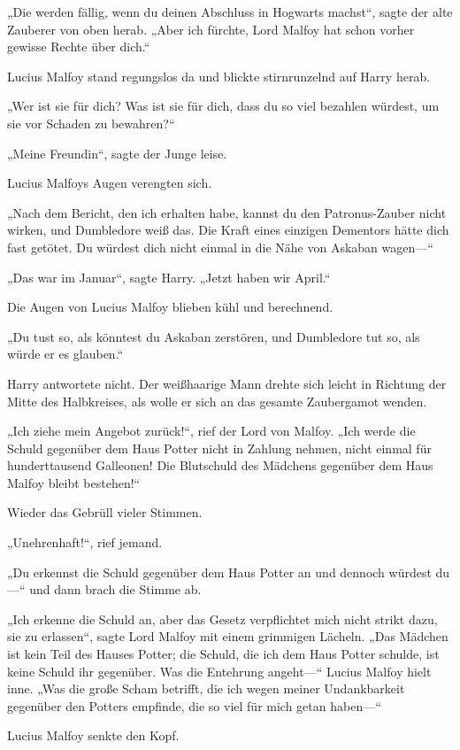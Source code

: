 {„Die werden fällig, wenn du deinen Abschluss in Hogwarts machst“, sagte der alte Zauberer von oben herab. „Aber ich fürchte, Lord Malfoy hat schon vorher gewisse Rechte über dich.“

Lucius Malfoy stand regungslos da und blickte stirnrunzelnd auf Harry herab.

„Wer ist sie für dich? Was ist sie für dich, dass du so viel bezahlen würdest, um sie vor Schaden zu bewahren?“

„Meine Freundin“, sagte der Junge leise.

Lucius Malfoys Augen verengten sich.

„Nach dem Bericht, den ich erhalten habe, kannst du den Patronus-Zauber nicht wirken, und Dumbledore weiß das. Die Kraft eines einzigen Dementors hätte dich fast getötet. Du würdest dich nicht einmal in die Nähe von Askaban wagen—“

„Das war im Januar“, sagte Harry. „Jetzt haben wir April.“

Die Augen von Lucius Malfoy blieben kühl und berechnend.

„Du tust so, als könntest du Askaban zerstören, und Dumbledore tut so, als würde er es glauben.“

Harry antwortete nicht. Der weißhaarige Mann drehte sich leicht in Richtung der Mitte des Halbkreises, als wolle er sich an das gesamte Zaubergamot wenden.

„Ich ziehe mein Angebot zurück!“, rief der Lord von Malfoy. „Ich werde die Schuld gegenüber dem Haus Potter nicht in Zahlung nehmen, nicht einmal für hunderttausend Galleonen! Die Blutschuld des Mädchens gegenüber dem Haus Malfoy bleibt bestehen!“

Wieder das Gebrüll vieler Stimmen.

„Unehrenhaft!“, rief jemand.

„Du erkennst die Schuld gegenüber dem Haus Potter an und dennoch würdest du—“ und dann brach die Stimme ab.

„Ich erkenne die Schuld an, aber das Gesetz verpflichtet mich nicht strikt dazu, sie zu erlassen“, sagte Lord Malfoy mit einem grimmigen Lächeln. „Das Mädchen ist kein Teil des Hauses Potter; die Schuld, die ich dem Haus Potter schulde, ist keine Schuld ihr gegenüber. Was die Entehrung angeht—“ Lucius Malfoy hielt inne. „Was die große Scham betrifft, die ich wegen meiner Undankbarkeit gegenüber den Potters empfinde, die so viel für mich getan haben—“

Lucius Malfoy senkte den Kopf.

}
